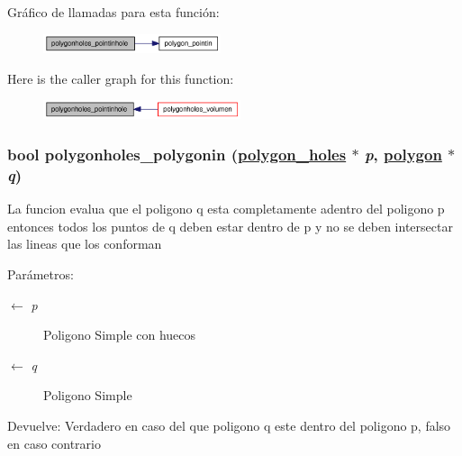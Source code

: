 Gr\'{a}fico de llamadas para esta funci\'{o}n:\begin{figure}[H]
\begin{center}
\leavevmode
\includegraphics[width=148pt]{group__geometry_g139317720b027c782db9424256ba2c2d_g139317720b027c782db9424256ba2c2d_cgraph}
\end{center}
\end{figure}


Here is the caller graph for this function:\begin{figure}[H]
\begin{center}
\leavevmode
\includegraphics[width=164pt]{group__geometry_g139317720b027c782db9424256ba2c2d_g139317720b027c782db9424256ba2c2d_icgraph}
\end{center}
\end{figure}
\hypertarget{group__geometry_g496bae87588cb5710ced80f713da98ad_g496bae87588cb5710ced80f713da98ad}{
\subsubsection[polygonholes\_\-polygonin]{\setlength{\rightskip}{0pt plus 5cm}bool polygonholes\_\-polygonin (\hyperlink{struct__polygon__holes}{polygon\_\-holes} $\ast$ {\em p}, \hyperlink{struct__polygon}{polygon} $\ast$ {\em q})}}
\label{group__geometry_g496bae87588cb5710ced80f713da98ad_g496bae87588cb5710ced80f713da98ad}


La funcion evalua que el poligono q esta completamente adentro del poligono p entonces todos los puntos de q deben estar dentro de p y no se deben intersectar las lineas que los conforman

\begin{Desc}
\item[Par\'{a}metros:]
\begin{description}
\item[\mbox{$\leftarrow$} {\em p}]Poligono Simple con huecos \item[\mbox{$\leftarrow$} {\em q}]Poligono Simple \end{description}
\end{Desc}
\begin{Desc}
\item[Devuelve:]Verdadero en caso del que poligono q este dentro del poligono p, falso en caso contrario \end{Desc}


